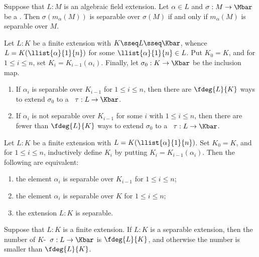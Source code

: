\documentclass{article}
\begin{document}
  \begin{tproposition}
    Suppose that $ L:M $ is an algebraic field extension.
    Let $ \alpha\in L $ and $ \sigma:M\to\Mbar $ be a \homo.
    Then $ \sigma(m_\alpha(M)) $ is separable over $ \sigma(M) $ if and only if $ m_\alpha(M) $ is separable over $ M $.
  \end{tproposition}

  \begin{ttheorem}
    Let $ L:K $ be a finite extension with $ K\sseq L\sseq \Kbar $, whence $ L=K(\llist{\alpha}{1}{n}) $ for some $ \llist{\alpha}{1}{n}\in L $.
    Put $ K_0=K $, and for $ 1\leq i\leq n $, set $ K_i=K_{i-1}(\alpha_i) $.
    Finally, let $ \sigma_0:K\to\Kbar $ be the inclusion map.
    \begin{enumerate}[label=(\roman*)]
      \item If $ \alpha_i $ is separable over $ K_{i-1} $ for $ 1\leq i\leq n $, then there are $ \fdeg{L}{K} $ ways to extend $ \sigma_0 $ to a \homo~$ \tau:L\to \Kbar $.
      \item If $ \alpha_i $ is not separable over $ K_{i-1} $ for some $ i $ with $ 1\leq i\leq n $, then there are fewer than $ \fdeg{L}{K} $ ways to extend $ \sigma_0 $ to a \homo~$ \tau:L\to \Kbar $.
    \end{enumerate}
  \end{ttheorem}

  \begin{ttheorem}
    Let $ L:K $ be a finite extension with $ L=K(\llist{\alpha}{1}{n}) $.
    Set $ K_0=K $, and for $ 1\leq i\leq n $, inductively define $ K_i $ by putting $ K_i=K_{i-1}(\alpha_i) $.
    Then the following are equivalent: \begin{enumerate}[label=(\roman*)]
      \item the element $ \alpha_i $ is separable over $ K_{i-1} $ for $ 1\leq i\leq n $;
      \item the element $ \alpha_i $ is separable over $ K $ for $ 1\leq i\leq n $;
      \item the extension $ L:K $ is separable.
    \end{enumerate}
  \end{ttheorem}

  \begin{tcorollary}
    Suppose that $ L:K $ is a finite extension.
    If $ L:K $ is a separable extension, then the number of $ K $-\homo~$ \sigma:L\to\Kbar $ is $ \fdeg{L}{K} $, and otherwise the number is smaller than $ \fdeg{L}{K} $.
  \end{tcorollary}
\end{document}

